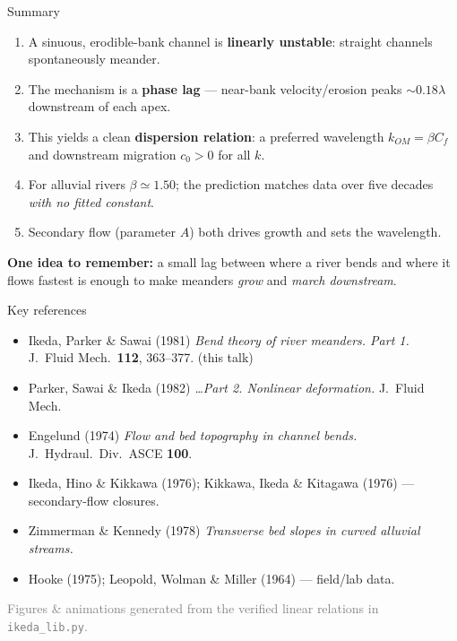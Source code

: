 \documentclass[aspectratio=169,10pt]{beamer}
\newcommand{\hl}[2]{\textcolor{#1}{\textbf{#2}}}
\begin{document}
\begin{frame}{Summary}
  \begin{enumerate}
    \item A sinuous, erodible-bank channel is \hl{cChannel}{linearly unstable}: straight
      channels spontaneously meander.
    \item The mechanism is a \hl{cEros}{phase lag} --- near-bank velocity/erosion peaks
      $\sim0.18\lambda$ downstream of each apex.
    \item This yields a clean \hl{cGrowth}{dispersion relation}: a preferred wavelength
      $k_{OM}=\beta C_f$ and downstream migration $c_0>0$ for all $k$.
    \item For alluvial rivers $\beta\simeq1.50$; the prediction matches data over five
      decades \emph{with no fitted constant}.
    \item Secondary flow (parameter $A$) both drives growth and sets the wavelength.
  \end{enumerate}
  \vfill
  \centering
  \colorbox{cChannel!10}{\parbox{0.92\linewidth}{\centering
  \textbf{One idea to remember:} a small lag between where a river bends and where it flows
  fastest is enough to make meanders \emph{grow} and \emph{march downstream}.}}
\end{frame}

\begin{frame}{Key references}
  \footnotesize
  \begin{itemize}
    \item Ikeda, Parker \& Sawai (1981) \emph{Bend theory of river meanders. Part 1.}
      J.\ Fluid Mech.\ \textbf{112}, 363--377. \hfill(this talk)
    \item Parker, Sawai \& Ikeda (1982) \emph{\dots Part 2. Nonlinear deformation.}
      J.\ Fluid Mech.
    \item Engelund (1974) \emph{Flow and bed topography in channel bends.} J.\ Hydraul.\ Div.\ ASCE \textbf{100}.
    \item Ikeda, Hino \& Kikkawa (1976); Kikkawa, Ikeda \& Kitagawa (1976) --- secondary-flow closures.
    \item Zimmerman \& Kennedy (1978) \emph{Transverse bed slopes in curved alluvial streams.}
    \item Hooke (1975); Leopold, Wolman \& Miller (1964) --- field/lab data.
  \end{itemize}
  \vfill
  \centering\scriptsize\textcolor{gray}{Figures \& animations generated from the verified
  linear relations in \texttt{ikeda\_lib.py}.}
\end{frame}
\end{document}

